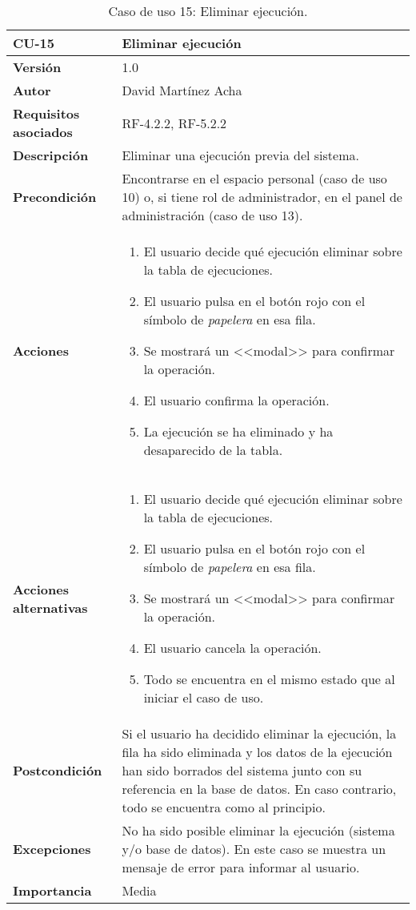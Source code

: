 \begin{table}[p]
	\centering
	\begin{tabularx}{\linewidth}{ p{} p{} }
		\toprule
		\textbf{CU-15}    & \textbf{Eliminar ejecución}\\
		\toprule
		\textbf{Versión}              & 1.0    \\
		\textbf{Autor}                & David Martínez Acha \\
		\textbf{Requisitos asociados} & RF-4.2.2, RF-5.2.2 \\
		\textbf{Descripción}          & Eliminar una ejecución previa del sistema. \\
		\textbf{Precondición}         & Encontrarse en el espacio personal (caso de uso 10) o, si tiene rol de administrador, en el panel de administración (caso de uso 13). \\
		\textbf{Acciones}             &
		\begin{enumerate}
			\def\labelenumi{\arabic{enumi}.}
			\tightlist
			\item El usuario decide qué ejecución eliminar sobre la tabla de ejecuciones.
			\item El usuario pulsa en el botón rojo con el símbolo de \textit{papelera} en esa fila.
			\item Se mostrará un <<modal>> para confirmar la operación.
			\item El usuario confirma la operación.
			\item La ejecución se ha eliminado y ha desaparecido de la tabla.
		\end{enumerate}\\
		\textbf{Acciones alternativas}&
		\begin{enumerate}
			\def\labelenumi{\arabic{enumi}.}
			\tightlist
			\item El usuario decide qué ejecución eliminar sobre la tabla de ejecuciones.
			\item El usuario pulsa en el botón rojo con el símbolo de \textit{papelera} en esa fila.
			\item Se mostrará un <<modal>> para confirmar la operación.
			\item El usuario cancela la operación.
			\item Todo se encuentra en el mismo estado que al iniciar el caso de uso.
		\end{enumerate}\\
		\textbf{Postcondición}        & Si el usuario ha decidido eliminar la ejecución, la fila ha sido eliminada y los datos de la ejecución han sido borrados del sistema junto con su referencia en la base de datos. 
		En caso contrario, todo se encuentra como al principio.\\
		\textbf{Excepciones}          & No ha sido posible eliminar la ejecución (sistema y/o base de datos). En este caso se muestra un mensaje de error para informar al usuario. \\
		\textbf{Importancia}          & Media \\
		\bottomrule
	\end{tabularx}
	\caption{Caso de uso 15: Eliminar ejecución.}
\end{table}

